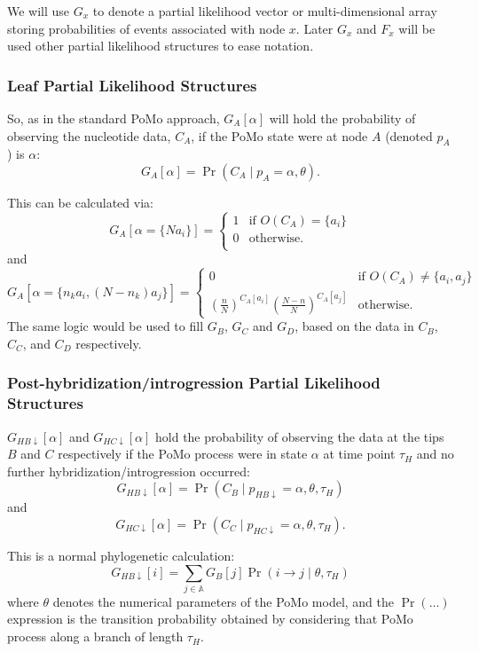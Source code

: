 \documentclass{article}
\begin{document}
We will use $G_x$ to denote a partial likelihood vector or multi-dimensional array storing probabilities of events associated with node $x$. Later $G_x$ and $F_x$ will be used other partial likelihood structures to ease notation.

\subsubsection{Leaf Partial Likelihood Structures}
So, as in the standard PoMo approach,
$G_A[\alpha]$ will hold the probability of observing the nucleotide data, $C_A$, if the PoMo state were at node $A$ (denoted $p_A$) is $\alpha$:
$$G_A[\alpha] = \Pr\left(C_A\mid p_A = \alpha, \theta\right).$$

This can be calculated via:
\begin{equation}
G_A[\alpha=\{N a_i \}] = \left\{
  \begin{array}{ll}
    1 & \mbox{if } O(C_A) = \{a_i\} \\
    0 & \mbox{otherwise.} \\
  \end{array}\right.
\end{equation}
and
\begin{equation}
G_A[\alpha=\{n_k a_i, (N-n_k) a_j \}] = \left\{
  \begin{array}{ll}
  0 & \mbox{if } O(C_A) \neq \{a_i, a_j\} \\
    \left(\frac{n}{N}\right)^{C_A[a_i]}\left(\frac{N-n}{N}\right)^{C_A[a_j]} & \mbox{otherwise.}  
  \end{array}\right. 
\end{equation}
The same logic would be used to fill $G_B$, $G_C$ and $G_D$, based on the data  in $C_B$, $C_C$, and $C_D$ respectively.
\subsubsection{Post-hybridization/introgression Partial Likelihood Structures}
$G_{HB\downarrow}[\alpha]$ and $G_{HC\downarrow}[\alpha]$ hold the probability of observing the data at the tips $B$ and $C$ respectively if the PoMo process were in state $\alpha$ at time point $\tau_{H}$ and 
no further hybridization/introgression occurred:
$$G_{HB\downarrow}[\alpha] = \Pr\left(C_B\mid p_{HB\downarrow}=\alpha, \theta, \tau_H\right)$$
and
$$G_{HC\downarrow}[\alpha] = \Pr\left(C_C\mid p_{HC\downarrow}=\alpha, \theta, \tau_H\right).$$

This is a normal phylogenetic calculation:
\begin{equation}
G_{HB\downarrow}[i] = \sum_{j\in \mathbb{A}} G_B[j]\Pr\left(i\rightarrow j \mid \theta, \tau_{H}\right)
\end{equation}
where  $\theta$ denotes the numerical parameters of the PoMo model, and the $\Pr(\ldots)$ expression is the transition probability obtained by considering that PoMo process along a branch of length $\tau_{H}$.
\end{document}
